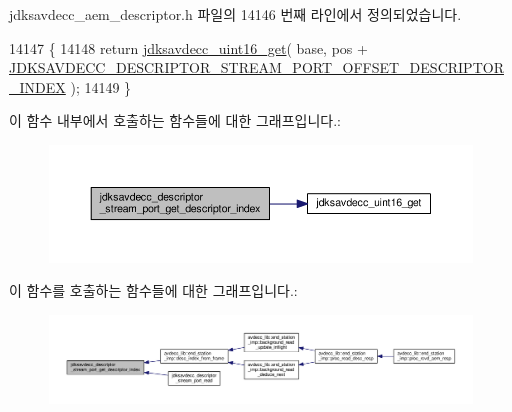 jdksavdecc\+\_\+aem\+\_\+descriptor.\+h 파일의 14146 번째 라인에서 정의되었습니다.


\begin{DoxyCode}
14147 \{
14148     \textcolor{keywordflow}{return} \hyperlink{group__endian_ga3fbbbc20be954aa61e039872965b0dc9}{jdksavdecc\_uint16\_get}( base, pos + 
      \hyperlink{group__descriptor__stream__port_gaf70639e574f693c20b7635c300612a5d}{JDKSAVDECC\_DESCRIPTOR\_STREAM\_PORT\_OFFSET\_DESCRIPTOR\_INDEX}
       );
14149 \}
\end{DoxyCode}


이 함수 내부에서 호출하는 함수들에 대한 그래프입니다.\+:
\nopagebreak
\begin{figure}[H]
\begin{center}
\leavevmode
\includegraphics[width=350pt]{group__descriptor__stream__port_ga7676ebd6ce26b6ef2d09bb93007f7c53_cgraph}
\end{center}
\end{figure}




이 함수를 호출하는 함수들에 대한 그래프입니다.\+:
\nopagebreak
\begin{figure}[H]
\begin{center}
\leavevmode
\includegraphics[width=350pt]{group__descriptor__stream__port_ga7676ebd6ce26b6ef2d09bb93007f7c53_icgraph}
\end{center}
\end{figure}


